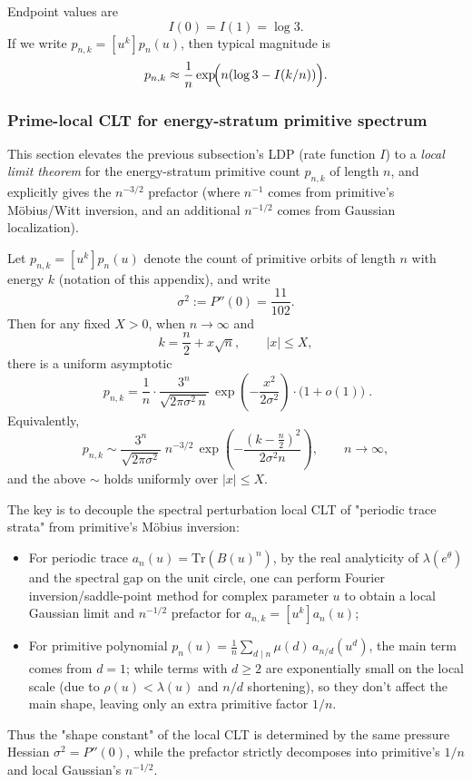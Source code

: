 Endpoint values are
\[
I(0)=I(1)=\log 3.
\]
If we write $p_{n,k}=[u^k]p_n(u)$, then typical magnitude is
\[
p_{n,k}\approx \frac{1}{n}\exp\!\Bigl(n(\log 3-I(k/n))\Bigr).
\]

\subsubsection{Prime-local CLT for energy-stratum primitive spectrum}\label{app:prime-local-clt}
This section elevates the previous subsection's LDP (rate function \(I\)) to a \emph{local limit theorem} for the energy-stratum primitive count \(p_{n,k}\) of length \(n\), and explicitly gives the \(n^{-3/2}\) prefactor (where \(n^{-1}\) comes from primitive's Möbius/Witt inversion, and an additional \(n^{-1/2}\) comes from Gaussian localization).

\begin{theorem}\label{thm:prime-local-clt}
Let \(p_{n,k}=[u^k]p_n(u)\) denote the count of primitive orbits of length \(n\) with energy \(k\) (notation of this appendix), and write
\[
\sigma^2:=P''(0)=\frac{11}{102}.
\]
Then for any fixed \(X>0\), when \(n\to\infty\) and
\[
k=\frac{n}{2}+x\sqrt{n},\qquad |x|\le X,
\]
there is a uniform asymptotic
\[
\boxed{\;
p_{n,k}
=\frac{1}{n}\cdot \frac{3^n}{\sqrt{2\pi\sigma^2\,n}}\,
\exp\!\left(-\frac{x^2}{2\sigma^2}\right)\cdot \bigl(1+o(1)\bigr)\; }.
\]
Equivalently,
\[
p_{n,k}\sim \frac{3^n}{\sqrt{2\pi\sigma^2}}\;n^{-3/2}\,
\exp\!\left(-\frac{(k-\frac{n}{2})^2}{2\sigma^2 n}\right),
\qquad n\to\infty,
\]
and the above \(\sim\) holds uniformly over \(|x|\le X\).
\end{theorem}
\begin{remark}\label{rem:prime-local-clt-proof-idea}
The key is to decouple the spectral perturbation local CLT of "periodic trace strata" from primitive's Möbius inversion:
\begin{itemize}
  \item For periodic trace \(a_n(u)=\mathrm{Tr}(B(u)^n)\), by the real analyticity of \(\lambda(e^\theta)\) and the spectral gap on the unit circle, one can perform Fourier inversion/saddle-point method for complex parameter \(u\) to obtain a local Gaussian limit and \(n^{-1/2}\) prefactor for \(a_{n,k}=[u^k]a_n(u)\);
  \item For primitive polynomial \(p_n(u)=\frac{1}{n}\sum_{d\mid n}\mu(d)\,a_{n/d}(u^d)\), the main term comes from \(d=1\); while terms with \(d\ge 2\) are exponentially small on the local scale (due to \(\rho(u)<\lambda(u)\) and \(n/d\) shortening), so they don't affect the main shape, leaving only an extra primitive factor \(1/n\).
\end{itemize}
Thus the "shape constant" of the local CLT is determined by the same pressure Hessian \(\sigma^2=P''(0)\), while the prefactor strictly decomposes into primitive's \(1/n\) and local Gaussian's \(n^{-1/2}\).
\end{remark}

